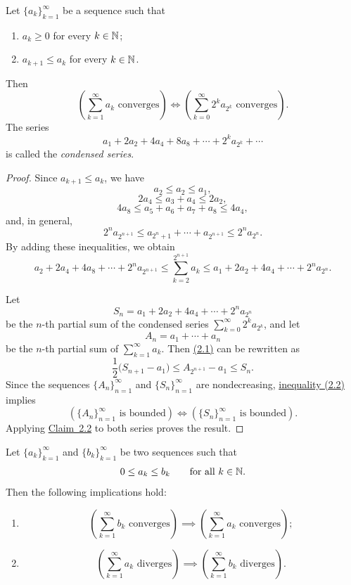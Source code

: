 \begin{claim}\label{claim:2.3}
Let $\{a_k\}_{k=1}^{\infty}$ be a sequence such that
\begin{enumerate}[label=\alph*)]
\item\label{item:claim:2.3:a} $a_k\ge0$ for every $k\in\mathbb{N}$;
\item\label{item:claim:2.3:b} $a_{k+1}\le a_k$ for every $k\in\mathbb{N}$.
\end{enumerate}
Then
\[
\left(\sum_{k=1}^{\infty}a_k\text{ converges}\right)
\iff
\left(\sum_{k=0}^{\infty}2^k a_{2^k}\text{ converges}\right).
\]
The series
\[
a_1+2a_2+4a_4+8a_8+\cdots+2^ka_{2^k}+\cdots
\]
is called the \emph{condensed series}.
\end{claim}

\begin{proof}
Since $a_{k+1}\le a_k$, we have
\[
a_2\le a_2\le a_1,
\]
\[
2a_4\le a_3+a_4\le2a_2,
\]
\[
4a_8\le a_5+a_6+a_7+a_8\le4a_4,
\]
and, in general,
\[
2^n a_{2^{n+1}}
\le a_{2^n+1}+\cdots+a_{2^{n+1}}
\le2^n a_{2^n}.
\]
By adding these inequalities, we obtain
\begin{equation}
 a_2+2a_4+4a_8+\cdots+2^n a_{2^{n+1}}
 \le \sum_{k=2}^{2^{n+1}}a_k
 \le a_1+2a_2+4a_4+\cdots+2^n a_{2^n}.
 \tag{2.1}\label{eq:2:2-1:1}
\end{equation}

Let
\[
S_n=a_1+2a_2+4a_4+\cdots+2^n a_{2^n}
\]
be the $n$-th partial sum of the condensed series $\sum_{k=0}^{\infty}2^k a_{2^k}$, and let
\[
A_n=a_1+\cdots+a_n
\]
be the $n$-th partial sum of $\sum_{k=1}^{\infty}a_k$. Then \hyperref[eq:2:2-1:1]{(2.1)} can be rewritten as
\begin{equation}
\frac12\bigl(S_{n+1}-a_1\bigr)
\le A_{2^{n+1}}-a_1
\le S_n.
\tag{2.2}\label{eq:2:2-2:1}
\end{equation}
Since the sequences $\{A_n\}_{n=1}^{\infty}$ and $\{S_n\}_{n=1}^{\infty}$ are nondecreasing, \hyperref[eq:2:2-2:1]{inequality (2.2)} implies
\[
\left(\{A_n\}_{n=1}^{\infty}\text{ is bounded}\right)
\iff
\left(\{S_n\}_{n=1}^{\infty}\text{ is bounded}\right).
\]
Applying \hyperref[claim:2.2]{Claim~2.2} to both series proves the result.
\end{proof}

\begin{claim}\label{claim:2.4}
Let $\{a_k\}_{k=1}^{\infty}$ and $\{b_k\}_{k=1}^{\infty}$ be two sequences such that
\[
0\le a_k\le b_k\qquad\text{for all }k\in\mathbb{N}.
\]
Then the following implications hold:
\begin{enumerate}[label=\arabic*)]
\item\label{item:claim:2.4:1}
\[
\left(\sum_{k=1}^{\infty}b_k\text{ converges}\right)
\implies
\left(\sum_{k=1}^{\infty}a_k\text{ converges}\right);
\]
\item\label{item:claim:2.4:2}
\[
\left(\sum_{k=1}^{\infty}a_k\text{ diverges}\right)
\implies
\left(\sum_{k=1}^{\infty}b_k\text{ diverges}\right).
\]
\end{enumerate}
\end{claim}

